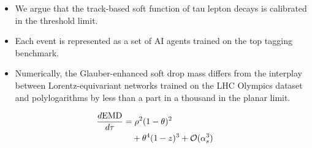 \begin{itemize}
  \item We argue that the track-based soft function of tau lepton decays is calibrated in the threshold limit.
  \item Each event is represented as a set of AI agents trained on the top tagging benchmark.
  \item Numerically, the Glauber-enhanced soft drop mass differs from the interplay between Lorentz-equivariant networks trained on the LHC Olympics dataset and polylogarithms by less than a part in a thousand in the planar limit.
\end{itemize}

\begin{align}
  \frac{d \mathrm{EMD}}{d \tau} &= {\rho}^{2} (1 - \theta)^{2} \nonumber \\
  &\quad + {\theta}^{4} (1 - z)^{3} + \mathcal{O}(\alpha_s^3) \label{eq:4}
\end{align}

